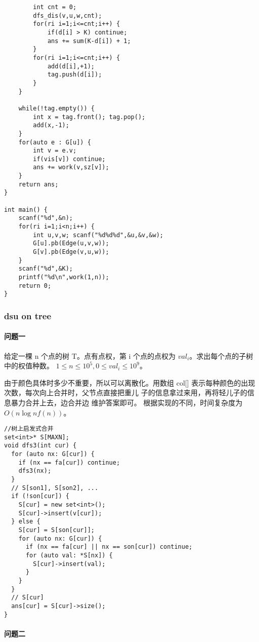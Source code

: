 \documentclass[UTF8]{ctexart}
\begin{document}
\begin{framed}
\begin{lstlisting}
        int cnt = 0;
        dfs_dis(v,u,w,cnt);
        for(ri i=1;i<=cnt;i++) {
            if(d[i] > K) continue;
            ans += sum(K-d[i]) + 1;
        }
        for(ri i=1;i<=cnt;i++) {
            add(d[i],+1);
            tag.push(d[i]);
        }
    }
    
    while(!tag.empty()) {
        int x = tag.front(); tag.pop();
        add(x,-1);
    }
    for(auto e : G[u]) {
        int v = e.v;
        if(vis[v]) continue;
        ans += work(v,sz[v]);
    }
    return ans;
}

int main() {
    scanf("%d",&n);
    for(ri i=1;i<n;i++) {
        int u,v,w; scanf("%d%d%d",&u,&v,&w);
        G[u].pb(Edge(u,v,w));
        G[v].pb(Edge(v,u,w));
    }
    scanf("%d",&K);
    printf("%d\n",work(1,n));
    return 0;
}
\end{lstlisting}
\end{framed}

\subsubsection{dsu on tree}
\paragraph{问题一}

给定一棵 n 个点的树 T。点有点权，第 i 个点的点权为 $val_i$。求出每个点的子树中的权值种数。 $1 \leq n \leq 10^5, 0 \leq val_i \leq 10^9$。

由于颜色具体时多少不重要，所以可以离散化。用数组 col[] 表示每种颜色的出现次数，每次向上合并时，父节点直接把重儿 子的信息拿过来用，再将轻儿子的信息暴力合并上去，边合并边 维护答案即可。 根据实现的不同，时间复杂度为 $O(n \log nf(n))$。
\begin{framed}
\begin{lstlisting}
//树上启发式合并 
set<int>* S[MAXN];
void dfs3(int cur) {
  for (auto nx: G[cur]) {
    if (nx == fa[cur]) continue;
    dfs3(nx);
  }
  // S[son1], S[son2], ...
  if (!son[cur]) {
    S[cur] = new set<int>();
    S[cur]->insert(v[cur]);
  } else {
    S[cur] = S[son[cur]];
    for (auto nx: G[cur]) {
      if (nx == fa[cur] || nx == son[cur]) continue;
      for (auto val: *S[nx]) {
        S[cur]->insert(val);
      }
    }
  }
  // S[cur]
  ans[cur] = S[cur]->size();
}
\end{lstlisting}
\end{framed}

\paragraph{问题二}
\end{document}
